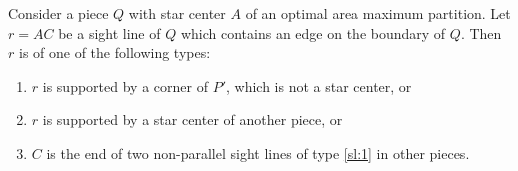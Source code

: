 \documentclass{theoretics}
\begin{document}
\begin{lemma}\label{lem:sltypes}
Consider a piece $Q$ with star center $A$ of an optimal area maximum partition.
Let $r=AC$ be a sight line of $Q$ which contains an edge on the boundary of $Q$.
Then $r$ is of one of the following types:
\begin{enumerate}[label=(\roman*)]
\item \label{sl:1}
$r$ is supported by a corner of $P'$, which is not a star center, or

\item \label{sl:2}
$r$ is supported by a star center of another piece, or

\item \label{sl:3}
$C$ is the end of two non-parallel sight lines of type \ref{sl:1} in other pieces.
\end{enumerate}
\end{lemma}
\end{document}
